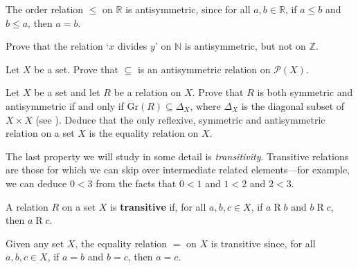 \begin{example}
The order relation $\le$ on $\mathbb{R}$ is antisymmetric, since for all $a,b \in \mathbb{R}$, if $a \le b$ and $b \le a$, then $a=b$.
\end{example}

\begin{exercise}
\label{exDivisibilityIsOrIsNotAntisymmetric}
Prove that the relation `$x$ divides $y$' on $\mathbb{N}$ is antisymmetric, but not on $\mathbb{Z}$.
\end{exercise}

\begin{exercise}
Let $X$ be a set. Prove that $\subseteq$ is an antisymmetric relation on $\mathcal{P}(X)$.
\end{exercise}

\begin{exercise}
Let $X$ be a set and let $R$ be a relation on $X$. Prove that $R$ is both symmetric and antisymmetric if and only if $\mathrm{Gr}(R) \subseteq \Delta_X$, where $\Delta_X$ is the diagonal subset of $X \times X$ (see ). Deduce that the only reflexive, symmetric and antisymmetric relation on a set $X$ is the equality relation on $X$.
\end{exercise}

The last property we will study in some detail is \textit{transitivity}. Transitive relations are those for which we can skip over intermediate related elements---for example, we can deduce $0 < 3$ from the facts that $0 < 1$ and $1 < 2$ and $2 < 3$.

\begin{definition}
\label{defTransitiveRelation}
A relation $R$ on a set $X$ is \textbf{transitive} if, for all $a,b,c \in X$, if $a \mathrel{R} b$ and $b \mathrel{R} c$, then $a \mathrel{R} c$.
\end{definition}

\begin{center}
\end{center}

\begin{example}
\label{exEqualityIsTransitive}
Given any set $X$, the equality relation $=$ on $X$ is transitive since, for all $a,b,c \in X$, if $a=b$ and $b=c$, then $a=c$.
\end{example}

